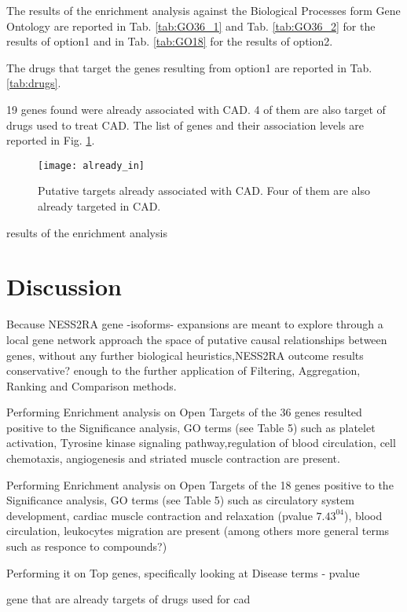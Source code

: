 \documentclass[fleqn,10pt]{SelfArx} %
\begin{document}
The results of the enrichment analysis against the Biological Processes form Gene Ontology are reported in Tab. \ref{tab:GO36_1} and Tab. \ref{tab:GO36_2} for the results of option1 and in Tab. \ref*{tab:GO18} for the results of option2.

The drugs that target the genes resulting from option1 are reported in Tab. \ref{tab:drugs}.

19 genes found were already associated with CAD. 4 of them are also target of drugs used to treat CAD. The list of genes and their association levels are reported in Fig. \ref{fig:19CAD}.


\begin{figure}[ht]
	\texttt{[image: already\_in]}
	\smallskip
	\caption{Putative targets already associated with CAD. Four of them are also already targeted in CAD.}
	\label{fig:19CAD}
\end{figure}

results of the enrichment analysis

\section*{Discussion}
Because NESS2RA gene -isoforms- expansions are meant to explore through a local gene network approach the space of putative causal relationships between genes, without any further biological heuristics,NESS2RA outcome results conservative? enough to the further application of Filtering, Aggregation, Ranking and Comparison methods.



Performing Enrichment analysis on Open Targets of the 36 genes resulted positive to the Significance analysis, GO terms (see Table 5) such as platelet activation, Tyrosine kinase signaling pathway,regulation of blood circulation, cell chemotaxis, angiogenesis and striated muscle contraction are present. 

Performing Enrichment analysis on Open Targets of the 18 genes positive to the Significance analysis, GO terms (see Table 5) such as circulatory system development, cardiac muscle contraction and relaxation (pvalue $7.43^04$), blood circulation, leukocytes migration are present (among others more general terms such as responce to compounds?) 
 
Performing it on Top genes, specifically looking at Disease terms - pvalue

gene that are already targets of drugs used for cad
\end{document}
